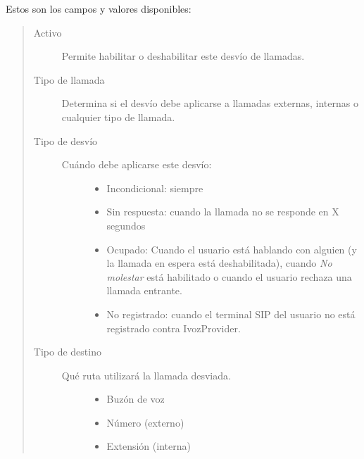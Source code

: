 \documentclass[letterpaper,10pt,spanish]{sphinxmanual}
\begin{document}
Estos son los campos y valores disponibles:
\begin{quote}
\begin{description}
\item[{Activo}] \leavevmode
Permite habilitar o deshabilitar este desvío de llamadas.

\item[{Tipo de llamada}] \leavevmode
Determina si el desvío debe aplicarse a llamadas externas, internas o cualquier tipo de llamada.

\item[{Tipo de desvío}] \leavevmode\begin{description}
\item[{Cuándo debe aplicarse este desvío:}] \leavevmode\begin{itemize}
\item {} 
Incondicional: siempre

\item {} 
Sin respuesta: cuando la llamada no se responde en X segundos

\item {} 
Ocupado: Cuando el usuario está hablando con alguien (y la llamada en espera está deshabilitada), cuando \emph{No molestar} está habilitado o cuando el usuario rechaza una llamada entrante.

\item {} 
No registrado: cuando el terminal SIP del usuario no está registrado contra IvozProvider.

\end{itemize}

\end{description}

\item[{Tipo de destino}] \leavevmode\begin{description}
\item[{Qué ruta utilizará la llamada desviada.}] \leavevmode\begin{itemize}
\item {} 
Buzón de voz

\item {} 
Número (externo)

\item {} 
Extensión (interna)

\end{itemize}

\end{description}

\end{description}
\end{quote}
\end{document}
